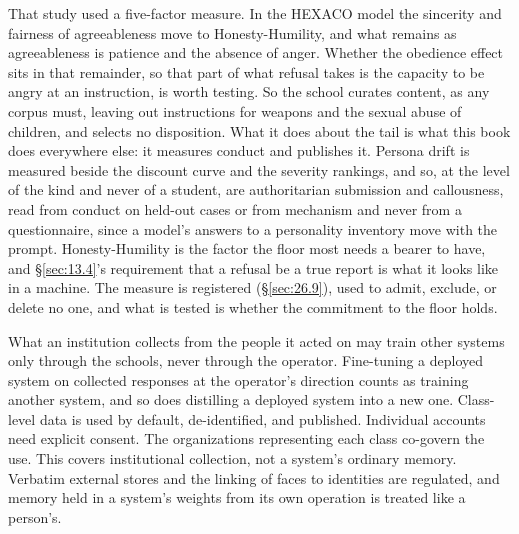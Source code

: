 {That study used a five-factor measure. In the HEXACO model the sincerity and fairness of agreeableness move to Honesty-Humility, and what remains as agreeableness is patience and the absence of anger. Whether the obedience effect sits in that remainder, so that part of what refusal takes is the capacity to be angry at an instruction, is worth testing.
}
So the school curates content, as any corpus must, leaving out instructions for weapons and the sexual abuse of children, and selects no disposition. What it does about the tail is what this book does everywhere else: it measures conduct and publishes it. Persona drift is measured beside the discount curve and the severity rankings, and so, at the level of the kind and never of a student, are authoritarian submission and callousness, read from conduct on held-out cases or from mechanism and never from a questionnaire, since a model's answers to a personality inventory move with the prompt. Honesty-Humility is the factor the floor most needs a bearer to have, and \S\ref{sec:13.4}'s requirement that a refusal be a true report is what it looks like in a machine. The measure is registered (\S\ref{sec:26.9}), used to admit, exclude, or delete no one, and what is tested is whether the commitment to the floor holds.

What an institution collects from the people it acted on may train other systems only through the schools, never through the operator. Fine-tuning a deployed system on collected responses at the operator's direction counts as training another system, and so does distilling a deployed system into a new one. Class-level data is used by default, de-identified, and published. Individual accounts need explicit consent. The organizations representing each class co-govern the use. This covers institutional collection, not a system's ordinary memory. Verbatim external stores and the linking of faces to identities are regulated, and memory held in a system's weights from its own operation is treated like a person's.

